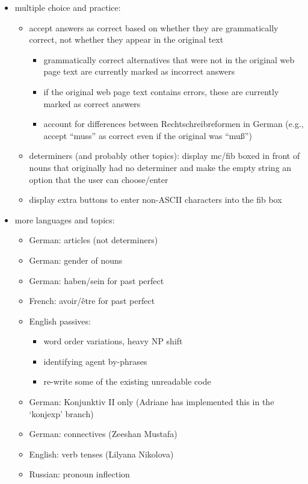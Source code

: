 \documentclass{article}
\begin{document}
\begin{itemize}
\item multiple choice and practice:
	\begin{itemize}
	\item accept answers as correct based on whether they are grammatically correct, not whether they appear in the original text
		\begin{itemize}
		\item grammatically correct alternatives that were not in the original web page text are currently marked as incorrect answers
		\item if the original web page text contains errors, these are currently marked as correct answers
		\item account for differences between Rechtschreibreformen in German (e.g., accept ``muss'' as correct even if the original was ``muß'')
		\end{itemize}
	\item determiners (and probably other topics): display mc/fib boxed in front of nouns that originally had no determiner and make the empty string an option that the user can choose/enter
	\item display extra buttons to enter non-ASCII characters into the fib box
	\end{itemize}
\item more languages and topics:
	\begin{itemize}
	\item German: articles (not determiners)
	\item German: gender of nouns
	\item German: haben/sein for past perfect
	\item French: avoir/être for past perfect
	\item English passives:
		\begin{itemize}
		\item word order variations, heavy NP shift
		\item identifying agent by-phrases
		\item re-write some of the existing unreadable code
		\end{itemize}
	\item German: Konjunktiv II only (Adriane has implemented this in the `konjexp' branch)
	\item German: connectives (Zeeshan Mustafa)
	\item English: verb tenses (Lilyana Nikolova)
	\item Russian: pronoun inflection

\end{itemize}
\end{itemize}
\end{document}
